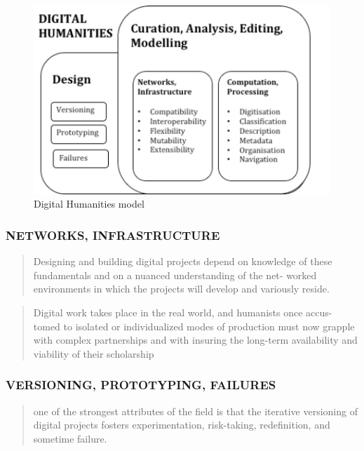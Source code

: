 \begin{draft}
  \begin{figure}[!htbp]
    \centering
      \includegraphics{images/dh01.png}
    \caption[Digital Humanities]{Digital Humanities model}
  \label{fig:Digital_Humanities}
  \end{figure}

  \subsubsection*{NETWORKS, INFRASTRUCTURE}
  \begin{quote}
    Designing and building digital projects depend on knowledge of these fundamentals and on a nuanced understanding of the net- worked environments in which the projects will develop and variously reside. \autocite[p.17]{Burdick2012}
  \end{quote}

  \begin{quote}
    Digital work takes place in the real world, and humanists once accus- tomed to isolated or individualized modes of production must now grapple with complex partnerships and with insuring the long-term availability and viability of their scholarship \autocite[p.21]{Burdick2012}
  \end{quote}

  \subsubsection*{VERSIONING, PROTOTYPING, FAILURES}
  \begin{quote}
    one of the strongest attributes of the field is that the iterative versioning of digital projects fosters experimentation, risk-taking, redefinition, and sometime failure. \autocite[p.21]{Burdick2012}
  \end{quote}


\end{draft}
